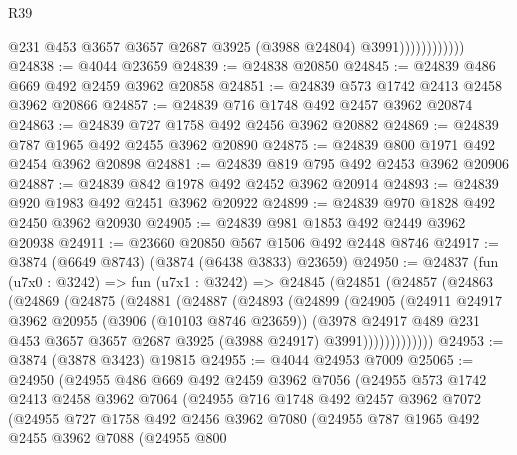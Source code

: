 \begin{lexlean}{R39}
\begin{coremodule}
                            @231
                            @453
                            @3657
                            @3657
                            @2687
                            @3925
                            (@3988 @24804)
                            @3991))))))))))))
@24838 := @4044 @23659
@24839 := @24838 @20850
@24845 := @24839 @486 @669 @492 @2459 @3962 @20858
@24851 := @24839 @573 @1742 @2413 @2458 @3962 @20866
@24857 := @24839 @716 @1748 @492 @2457 @3962 @20874
@24863 := @24839 @727 @1758 @492 @2456 @3962 @20882
@24869 := @24839 @787 @1965 @492 @2455 @3962 @20890
@24875 := @24839 @800 @1971 @492 @2454 @3962 @20898
@24881 := @24839 @819 @795 @492 @2453 @3962 @20906
@24887 := @24839 @842 @1978 @492 @2452 @3962 @20914
@24893 := @24839 @920 @1983 @492 @2451 @3962 @20922
@24899 := @24839 @970 @1828 @492 @2450 @3962 @20930
@24905 := @24839 @981 @1853 @492 @2449 @3962 @20938
@24911 := @23660 @20850 @567 @1506 @492 @2448 @8746
@24917 := @3874 (@6649 @8743) (@3874 (@6438 @3833) @23659)
@24950 := @24837
    (fun (u7x0 : @3242) =>
    fun (u7x1 : @3242) =>
    @24845
      (@24851
        (@24857
          (@24863
            (@24869
              (@24875
                (@24881
                  (@24887
                    (@24893
                      (@24899
                        (@24905
                          (@24911
                            @24917
                            @3962
                            @20955
                            (@3906 (@10103 @8746 @23659))
                            (@3978
                              @24917
                              @489
                              @231
                              @453
                              @3657
                              @3657
                              @2687
                              @3925
                              (@3988 @24917)
                              @3991)))))))))))))
@24953 := @3874 (@3878 @3423) @19815
@24955 := @4044 @24953 @7009
@25065 := @24950
    (@24955
      @486
      @669
      @492
      @2459
      @3962
      @7056
      (@24955
        @573
        @1742
        @2413
        @2458
        @3962
        @7064
        (@24955
          @716
          @1748
          @492
          @2457
          @3962
          @7072
          (@24955
            @727
            @1758
            @492
            @2456
            @3962
            @7080
            (@24955
              @787
              @1965
              @492
              @2455
              @3962
              @7088
              (@24955
                @800

\end{coremodule}
\end{lexlean}
